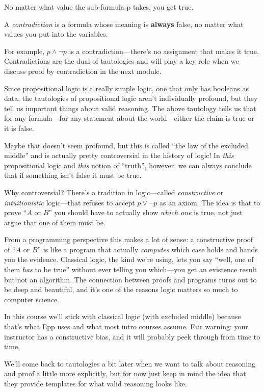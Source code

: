 \documentclass[11pt]{article}
\begin{document}
No matter what value the sub-formula p takes, you get true.

\begin{definition}[Contradiction]
A \emph{contradiction} is a formula whose meaning is \textbf{always} false, no matter what values you put into the variables.
\end{definition}

For example, $p \wedge \lnot p$ is a contradiction---there's no assignment that makes it true. Contradictions are the dual of tautologies and will play a key role when we discuss proof by contradiction in the next module.

Since propositional logic is a really simple logic, one that only has booleans as data, the tautologies of propositional logic aren't individually profound, but they tell us important things about valid reasoning. The above tautology tells us that for any formula---for any statement about the world---either the claim is true or it is false.

Maybe that doesn't seem profound, but this is called ``the law of the excluded middle'' and is actually pretty controversial in the history of logic! In \emph{this} propositional logic and \emph{this} notion of ``truth'', however, we can always conclude that if something isn't false it must be true.

Why controversial? There's a tradition in logic---called \emph{constructive} or \emph{intuitionistic} logic---that refuses to accept $p \vee \lnot p$ as an axiom. The idea is that to prove ``$A$ or $B$'' you should have to actually show \emph{which one} is true, not just argue that one of them must be.

From a programming perspective this makes a lot of sense: a constructive proof of ``$A$ or $B$'' is like a program that actually \emph{computes} which case holds and hands you the evidence. Classical logic, the kind we're using, lets you say ``well, one of them \emph{has} to be true'' without ever telling you which---you get an existence result but not an algorithm. The connection between proofs and programs turns out to be deep and beautiful, and it's one of the reasons logic matters so much to computer science.

In this course we'll stick with classical logic (with excluded middle) because that's what Epp uses and what most intro courses assume. Fair warning: your instructor has a constructive bias, and it will probably peek through from time to time.

We'll come back to tautologies a bit later when we want to talk about reasoning and proof a little more explicitly, but for now just keep in mind the idea that they provide templates for what valid reasoning looks like.
\end{document}
